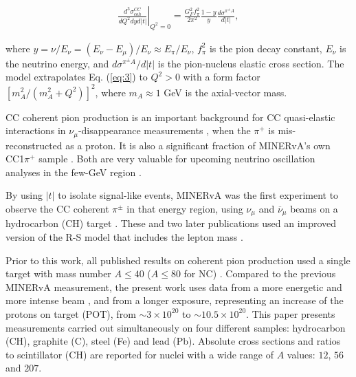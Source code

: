\documentclass[aps,prl,twocolumn,superscriptaddress,nofootinbib]{revtex4-1}
\begin{document}
\begin{eqnarray}
        \left.\frac{d^{3}\sigma^{CC}_{coh}}{dQ^{2}dy d\lvert t\rvert}\right\vert_{Q^{2}=0}=
        \frac{G^{2}_{F}f^{2}_{\pi}}{2\pi^{2}}\frac{1-y}{y}\frac{d\sigma^{\pi^{\pm}A}}
        {d\lvert t\rvert},
        \label{eq:3}
\end{eqnarray}

\noindent where $y=\nu/E_{\nu}=\left(E_{\nu}-E_{\mu}\right)/E_{\nu}\approx E_{\pi}/E_{\nu}$, $f^{2}_{\pi}$ is the pion decay constant, 
$E_{\nu}$ is the neutrino energy, and $d\sigma^{\pi^{\pm}A}/d\lvert t\rvert$ is the pion-nucleus 
elastic cross section. The model extrapolates Eq. (\ref{eq:3}) to $Q^{2}\!>\!0$ with a form factor $\left[m^{2}_{A}/\left(m^{2}_{A}{+}Q^{2}\right)\right]^{2}$, where $m_{A}\approx1$ GeV is the axial-vector mass. 

\par CC coherent pion production is an important background for CC quasi-elastic interactions in
$\nu_{\mu}$-disappearance measurements \cite{MINOS:2006foh}, when the $\pi^{+}$ is mis-reconstructed as a
proton. It is also a significant fraction of MINERvA's own CC1$\pi^{+}$ sample \cite{MINERvA:2022djk}. Both
are very valuable for upcoming neutrino oscillation analyses in the few-GeV region \cite{DUNE:2015lol,
Hyper-KamiokandeProto-:2015xww}.

\par By using $\lvert t\rvert$ to isolate signal-like events, MINERvA was the first experiment to 
observe the CC coherent $\pi^{\pm}$ in that energy region, using $\nu_{\mu}$ and $\overline{\nu}_{\mu}$
beams on a hydrocarbon (CH) target \cite{MINERvA:2014ani, MINERvA:2017ipy}. These and two later 
publications \cite{ArgoNeuT:2014uwh, T2K:2016soz} used an improved version of the R-S model that
includes the lepton mass \cite{Adler:2005ada, Rein:2006di}.

\par Prior to this work, all published results on coherent pion production used a single target with
mass number $A\leq40$ ($A\leq80$ for NC) \cite{CHARM-II:1993xmz, Faissner:1983ng, Isiksal:1984vh, WA59:1984wvj, CHARM:1985bva, SKAT:1985uch, Baltay:1986cv, BEBCWA59:1986jkg, E632:1988dqx, BEBCWA59:1988sqc, E632:1992ydt, K2K:2005uiu, MiniBooNE:2008mmr, SciBooNE:2008bzb, NOMAD:2009idt, SciBooNE:2010lca, MINERvA:2014ani, MINERvA:2017ipy, ArgoNeuT:2014uwh, T2K:2016soz}.
Compared to the previous MINERvA measurement, the present work uses data from a more energetic and
more intense beam \cite{Ainsworth:2020mqq}, and from a longer exposure, representing an increase of
the protons on target (POT), from ${\sim}3{\times}10^{20}$ to ${\sim}10.5{\times}10^{20}$. This paper
presents measurements carried out simultaneously on four different samples: hydrocarbon (CH), graphite
(C), steel (Fe) and lead (Pb). Absolute cross sections and ratios to scintillator (CH) are reported
for nuclei with a wide range of $A$ values: $12$, $56$ and $207$.
\end{document}
